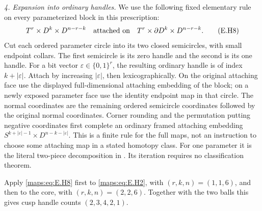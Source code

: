 \begin{theorem}
\emph{4. Expansion into ordinary handles.}
We use the following fixed elementary rule on every parameterized
block in this prescription:
\[
 T^r\times D^k\times D^{n-r-k}
 \quad\hbox{attached on}\quad
 T^r\times\partial D^k\times D^{n-r-k}.
 \tag{E.H8}\label{maps:eq:E.H8}
\]
Cut each ordered parameter circle into its two closed semicircles,
with small endpoint collars.  The first semicircle is its zero
handle and the second is its one handle.  For a bit vector
$\varepsilon\in\{0,1\}^r$, the resulting ordinary handle is of
index $k+|\varepsilon|$.  Attach by increasing $|\varepsilon|$,
then lexicographically.  On the original attaching face use
the displayed full-dimensional attaching embedding of the block;
on a newly exposed parameter face use the identity endpoint map
in that circle.  The normal coordinates are the remaining ordered
semicircle coordinates followed by the original normal coordinates.
Corner rounding and the permutation putting negative coordinates
first complete an ordinary framed attaching embedding
$S^{k+|\varepsilon|-1}\times D^{n-k-|\varepsilon|}$.
This is a finite rule for the full maps, not an instruction to choose
some attaching map in a stated homotopy class.  For one parameter
it is the literal two-piece decomposition in
\cite[Section~4.1, equation~(16), p.~103]{mapsVogel09}.
Its iteration requires no classification theorem.

Apply \eqref{maps:eq:E.H8} first to \eqref{maps:eq:E.H2}, with $(r,k,n)=(1,1,6)$, and then
to the core, with $(r,k,n)=(2,2,6)$.  Together with the two balls
this gives cusp handle counts $(2,3,4,2,1)$.


\end{theorem}
